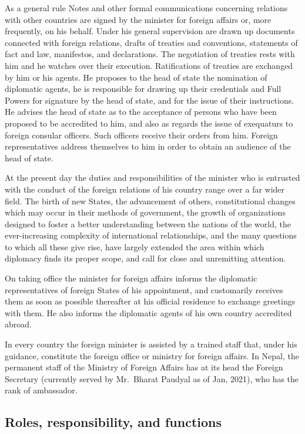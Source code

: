 \documentclass[
  openany]{book}
\begin{document}
As a general rule Notes and other formal communications concerning relations with other countries are signed by the minister for foreign affairs or, more frequently, on his behalf. Under his general supervision are drawn up documents connected with foreign relations, drafts of treaties and conventions, statements of fact and law, manifestos, and declarations. The negotiation of treaties rests with him and he watches over their execution. Ratifications of treaties are exchanged by him or his agents. He proposes to the head of state the nomination of diplomatic agents, he is responsible for drawing up their credentials and Full Powers for signature by the head of state, and for the issue of their instructions. He advises the head of state as to the acceptance of persons who have been proposed to be accredited to him, and also as regards the issue of exequaturs to foreign consular officers. Such officers receive their orders from him. Foreign representatives address themselves to him in order to obtain an audience of the head of state.

At the present day the duties and responsibilities of the minister who is entrusted with the conduct of the foreign relations of his country range over a far wider field. The birth of new States, the advancement of others, constitutional changes which may occur in their methods of government, the growth of organizations designed to foster a better understanding between the nations of the world, the ever-increasing complexity of international relationships, and the many questions to which all these give rise, have largely extended the area within which diplomacy finds its proper scope, and call for close and unremitting attention.

On taking office the minister for foreign affairs informs the diplomatic representatives of foreign States of his appointment, and customarily receives them as soon as possible thereafter at his official residence to exchange greetings with them. He also informs the diplomatic agents of his own country accredited abroad.

In every country the foreign minister is assisted by a trained staff that, under his guidance, constitute the foreign office or ministry for foreign affairs. In Nepal, the permanent staff of the Ministry of Foreign Affairs has at its head the Foreign Secretary (currently served by Mr.~Bharat Paudyal as of Jan, 2021), who has the rank of ambassador.

\hypertarget{roles-responsibility-and-functions}{%
\subsection{Roles, responsibility, and functions}\label{roles-responsibility-and-functions}}
\end{document}
